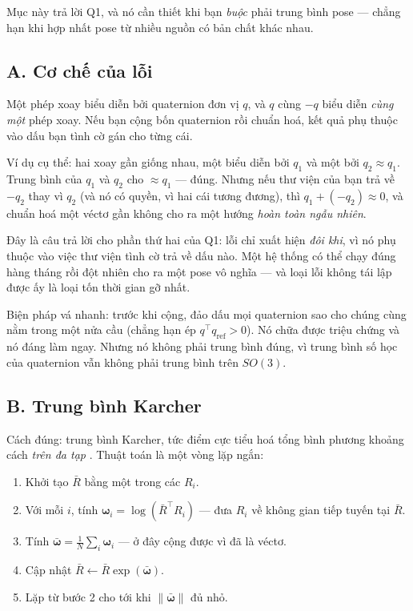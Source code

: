\documentclass[../../marker.tex]{subfiles}
\begin{document}
Mục này trả lời Q1, và nó cần thiết khi bạn \emph{buộc} phải trung bình pose --- chẳng hạn khi hợp nhất pose từ nhiều nguồn có bản chất khác nhau.

\subsection{A. Cơ chế của lỗi}

Một phép xoay biểu diễn bởi quaternion đơn vị \(q\), và \(q\) cùng \(-q\) biểu diễn \emph{cùng một} phép xoay. Nếu bạn cộng bốn quaternion rồi chuẩn hoá, kết quả phụ thuộc vào dấu bạn tình cờ gán cho từng cái.

Ví dụ cụ thể: hai xoay gần giống nhau, một biểu diễn bởi \(q_1\) và một bởi \(q_2 \approx q_1\). Trung bình của \(q_1\) và \(q_2\) cho \(\approx q_1\) --- đúng. Nhưng nếu thư viện của bạn trả về \(-q_2\) thay vì \(q_2\) (và nó có quyền, vì hai cái tương đương), thì \(q_1 + (-q_2) \approx 0\), và chuẩn hoá một véctơ gần không cho ra một hướng \emph{hoàn toàn ngẫu nhiên}.

Đây là câu trả lời cho phần thứ hai của Q1: lỗi chỉ xuất hiện \emph{đôi khi}, vì nó phụ thuộc vào việc thư viện tình cờ trả về dấu nào. Một hệ thống có thể chạy đúng hàng tháng rồi đột nhiên cho ra một pose vô nghĩa --- và loại lỗi không tái lập được ấy là loại tốn thời gian gỡ nhất.

Biện pháp vá nhanh: trước khi cộng, đảo dấu mọi quaternion sao cho chúng cùng nằm trong một nửa cầu (chẳng hạn ép \(q^\top q_{\text{ref}} > 0\)). Nó chữa được triệu chứng và nó đáng làm ngay. Nhưng nó không phải trung bình đúng, vì trung bình số học của quaternion vẫn không phải trung bình trên \(SO(3)\).

\subsection{B. Trung bình Karcher}

Cách đúng: trung bình Karcher, tức điểm cực tiểu hoá tổng bình phương khoảng cách \emph{trên đa tạp} \cite{moakher2002means}. Thuật toán là một vòng lặp ngắn:

\begin{enumerate}
\item Khởi tạo \(\bar{R}\) bằng một trong các \(R_i\).
\item Với mỗi \(i\), tính \(\boldsymbol{\omega}_i = \log(\bar{R}^\top R_i)\) --- đưa \(R_i\) về không gian tiếp tuyến tại \(\bar{R}\).
\item Tính \(\bar{\boldsymbol{\omega}} = \frac{1}{N}\sum_i \boldsymbol{\omega}_i\) --- ở đây cộng được vì đã là véctơ.
\item Cập nhật \(\bar{R} \leftarrow \bar{R}\exp(\bar{\boldsymbol{\omega}})\).
\item Lặp từ bước 2 cho tới khi \(\|\bar{\boldsymbol{\omega}}\|\) đủ nhỏ.
\end{enumerate}
\end{document}
